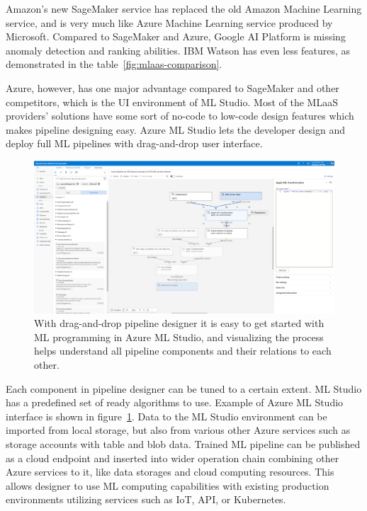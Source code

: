Amazon's new SageMaker service
has replaced the old Amazon Machine Learning service,
and is very much like Azure Machine Learning service
produced by Microsoft.
Compared to SageMaker and Azure,
Google AI Platform is missing anomaly detection and ranking abilities.
IBM Watson has even less features,
as demonstrated in the table~\ref{fig:mlaas-comparison}.~\cite{altexsoft2021mlaas}

Azure, however,
has one major advantage compared to SageMaker and other competitors,
which is the UI environment of ML Studio.
Most of the MLaaS providers' solutions
have some sort of no-code to low-code design features
which makes pipeline designing easy.
Azure ML Studio lets the developer design and deploy
full ML pipelines with drag-and-drop user interface.~\cite{altexsoft2021mlaas,microsoft2022azureml}

\begin{figure}[htb]
    \centering
    \includegraphics[width=150mm]{./appendices/azure-ml-studio-example}
    \caption{With drag-and-drop pipeline designer
    it is easy to get started with ML programming in Azure ML Studio,
    and visualizing the process helps understand all pipeline components
    and their relations to each other.
    \label{fig:azure-ml-studio-example}}
\end{figure}

Each component in pipeline designer can be tuned
to a certain extent.
ML Studio has a predefined set of ready algorithms to use.
Example of Azure ML Studio interface
is shown in figure~\ref{fig:azure-ml-studio-example}.
Data to the ML Studio environment
can be imported from local storage,
but also from various other Azure services
such as storage accounts with table and blob data.
Trained ML pipeline can be published as a cloud endpoint
and inserted into wider operation chain
combining other Azure services to it,
like data storages and cloud computing resources.
This allows designer to use ML computing capabilities
with existing production environments
utilizing services such as IoT, API, or Kubernetes.


